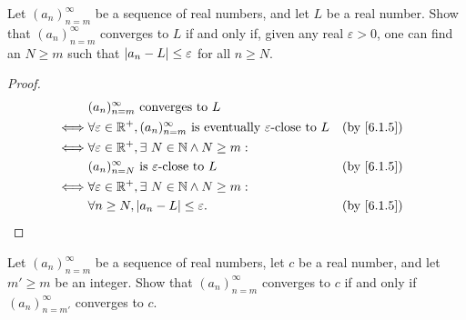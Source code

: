 \begin{ex}\label{ex:6.1.2}
  Let \((a_n)_{n = m}^\infty\) be a sequence of real numbers, and let \(L\) be a real number.
  Show that \((a_n)_{n = m}^\infty\) converges to \(L\) if and only if, given any real \(\varepsilon > 0\), one can find an \(N \geq m\) such that \(\left\lvert a_n - L\right\rvert \leq \varepsilon\) for all \(n \geq N\).
\end{ex}

\begin{proof}
  \begin{align*}
         & (a_n)_{n = m}^\infty \text{ converges to } L                                                                                           \\
    \iff & \forall \varepsilon \in \R^+, (a_n)_{n = m}^\infty \text{ is eventually } \varepsilon\text{-close to } L &  & \text{(by \cref{6.1.5})} \\
    \iff & \forall \varepsilon \in \R^+, \exists\ N \in \N \land N \geq m :                                                                       \\
         & (a_n)_{n = N}^\infty \text{ is } \varepsilon\text{-close to } L                                          &  & \text{(by \cref{6.1.5})} \\
    \iff & \forall \varepsilon \in \R^+, \exists\ N \in \N \land N \geq m :                                                                       \\
         & \forall n \geq N, \abs{a_n - L} \leq \varepsilon.                                                        &  & \text{(by \cref{6.1.5})}
  \end{align*}
\end{proof}

\begin{ex}\label{ex:6.1.3}
  Let \((a_n)_{n = m}^\infty\) be a sequence of real numbers, let \(c\) be a real number, and let \(m' \geq m\) be an integer.
  Show that \((a_n)_{n = m}^\infty\) converges to \(c\) if and only if \((a_n)_{n = m'}^\infty\) converges to \(c\).
\end{ex}

